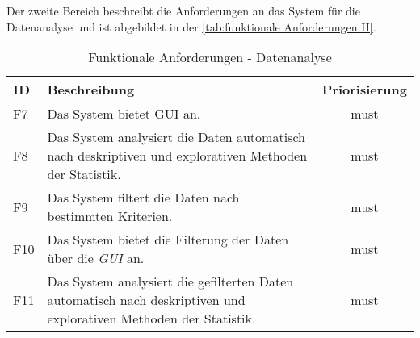Der zweite Bereich beschreibt die Anforderungen an das System für die Datenanalyse und ist abgebildet in der \autoref{tab:funktionale Anforderungen II}.

\begingroup
\setlength{\tabcolsep}{10pt} %
\renewcommand{\arraystretch}{1.0} 
\begin{table}[H]
    \centering
    \begin{adjustbox}{max width=\textwidth}
    \begin{tabular}{lp{15cm}c}
       \toprule
       \textbf{ID}          & \textbf{Beschreibung} &\textbf{Priorisierung}\\
       \midrule
        F7                               &Das System bietet \acrfull{GUI} an.  & must\\
        F8                               &Das System analysiert die Daten automatisch nach deskriptiven und explorativen Methoden der Statistik.  & must\\
        F9                               &Das System filtert die Daten nach bestimmten Kriterien.  & must\\ %
        F10                              &Das System bietet die Filterung der Daten über die \textit{\acrshort{GUI}} an.  & must\\
        F11                              &Das System analysiert die gefilterten Daten automatisch nach deskriptiven und explorativen Methoden der Statistik. & must\\                             
        \bottomrule
    \end{tabular}
    \end{adjustbox}
    \caption{%
        Funktionale Anforderungen - Datenanalyse
    }
    \label{tab:funktionale Anforderungen II}
    \end{table}
\endgroup

